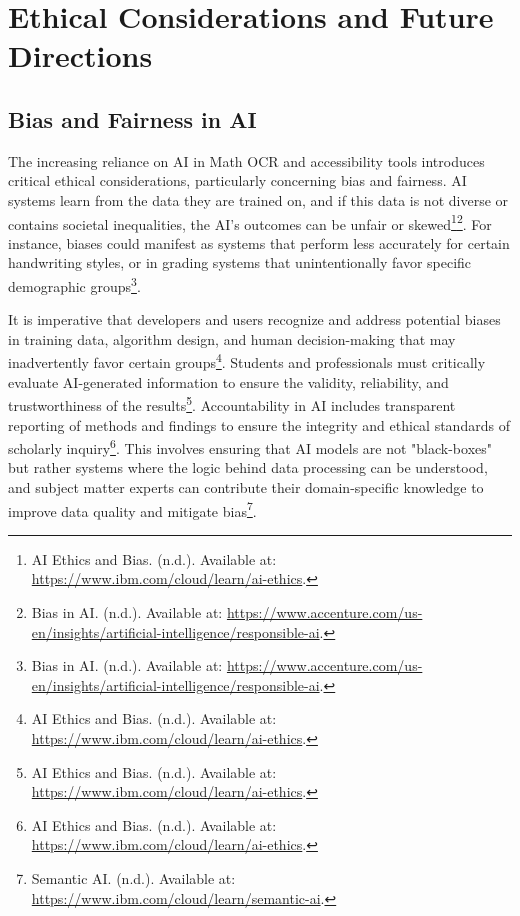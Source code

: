 \section{Ethical Considerations and Future Directions}\label{sec:ethical-considerations}
\subsection{Bias and Fairness in AI}
The increasing reliance on AI in Math OCR and accessibility tools introduces critical ethical considerations, particularly concerning bias and fairness. AI systems learn from the data they are trained on, and if this data is not diverse or contains societal inequalities, the AI's outcomes can be unfair or skewed\footnote{AI Ethics and Bias. (n.d.). Available at: \url{https://www.ibm.com/cloud/learn/ai-ethics}.}\footnote{Bias in AI. (n.d.). Available at: \url{https://www.accenture.com/us-en/insights/artificial-intelligence/responsible-ai}.}. For instance, biases could manifest as systems that perform less accurately for certain handwriting styles, or in grading systems that unintentionally favor specific demographic groups\footnote{Bias in AI. (n.d.). Available at: \url{https://www.accenture.com/us-en/insights/artificial-intelligence/responsible-ai}.}.

It is imperative that developers and users recognize and address potential biases in training data, algorithm design, and human decision-making that may inadvertently favor certain groups\footnote{AI Ethics and Bias. (n.d.). Available at: \url{https://www.ibm.com/cloud/learn/ai-ethics}.}. Students and professionals must critically evaluate AI-generated information to ensure the validity, reliability, and trustworthiness of the results\footnote{AI Ethics and Bias. (n.d.). Available at: \url{https://www.ibm.com/cloud/learn/ai-ethics}.}. Accountability in AI includes transparent reporting of methods and findings to ensure the integrity and ethical standards of scholarly inquiry\footnote{AI Ethics and Bias. (n.d.). Available at: \url{https://www.ibm.com/cloud/learn/ai-ethics}.}. This involves ensuring that AI models are not "black-boxes" but rather systems where the logic behind data processing can be understood, and subject matter experts can contribute their domain-specific knowledge to improve data quality and mitigate bias\footnote{Semantic AI. (n.d.). Available at: \url{https://www.ibm.com/cloud/learn/semantic-ai}.}.

